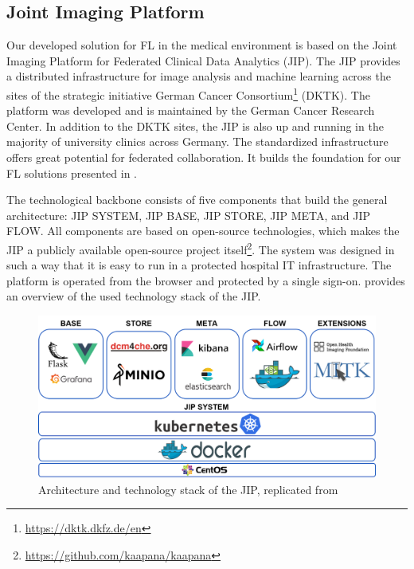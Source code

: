 \subsection{Joint Imaging Platform}
\label{subsec:JIP}

Our developed solution for FL in the medical environment is based on the Joint Imaging Platform for Federated Clinical Data Analytics (JIP).
The JIP provides a distributed infrastructure for image analysis and machine learning across the sites of the strategic initiative German Cancer Consortium\footnote{\url{https://dktk.dkfz.de/en}} (DKTK). The platform was developed and is maintained by the German Cancer Research Center. In addition to the DKTK sites, the JIP is also up and running in the majority of university clinics across Germany. The standardized infrastructure offers great potential for federated collaboration. It builds the foundation for our FL solutions presented in .

The technological backbone consists of five components that build the general architecture: JIP SYSTEM, JIP BASE, JIP STORE, JIP META, and JIP FLOW. All components are based on open-source technologies, which makes the JIP a publicly available open-source project itself\footnote{\url{https://github.com/kaapana/kaapana}}. The system was designed in such a way that it is easy to run in a protected hospital IT infrastructure. The platform is operated from the browser and protected by a single sign-on.   provides an overview of the used technology stack of the JIP.

\begin{figure}[htbp]
    \centerline{\includegraphics[width=1.0\columnwidth]{1_Figures/JIParchitecture.png}}
    \caption{Architecture and technology stack of the JIP, replicated from \cite{Scherer2020JointAnalytics}}
\label{fig:JIP}
\end{figure}


